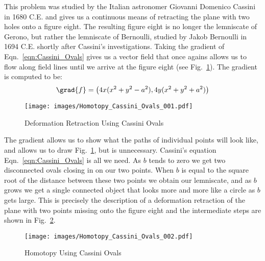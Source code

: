 \documentclass[oneside]{book}                                                  %
\begin{document}
                This problem was studied by the Italian astronomer Giovanni
                Domenico Cassini in 1680 C.E. and gives us a continuous means of
                retracting the plane with two holes onto a figure eight. The
                resulting figure eight is no longer the lemniscate of Gerono,
                but rather the lemniscate of Bernoulli, studied by Jakob
                Bernoulli in 1694 C.E. shortly after Cassini's investigations.
                Taking the gradient of Eqn.~\ref{eqn:Cassini_Ovals} gives us a
                vector field that once agains allows us to flow along field
                lines until we arrive at the figure eight
                (see Fig.~\ref{fig:Deformation_Retraction_Cassini_Ovals}). The
                gradient is computed to be:
                \begin{equation}
                    \grad{f}=\big(4x(x^{2}+y^{2}-a^{2}),4y(x^{2}+y^{2}+a^2)\big)
                \end{equation}
                \begin{figure}[H]
                    \centering
                    \captionsetup{type=figure}
                    \texttt{[image: images/Homotopy\_Cassini\_Ovals\_001.pdf]}
                    \caption{Deformation Retraction Using Cassini Ovals}
                    \label{fig:Deformation_Retraction_Cassini_Ovals}
                \end{figure}
                The gradient allows us to show what the paths of individual
                points will look like, and allows us to draw
                Fig.~\ref{fig:Deformation_Retraction_Cassini_Ovals}, but is
                unnecessary. Cassini's equation Eqn.~\ref{eqn:Cassini_Ovals} is
                all we need. As $b$ tends to zero we get two disconnected ovals
                closing in on our two points. When $b$ is equal to the square
                root of the distance between these two points we obtain our
                lemniscate, and as $b$ grows we get a single connected object
                that looks more and more like a circle as $b$ gets large. This
                is precisely the description of a deformation retraction of the
                plane with two points missing onto the figure eight and the
                intermediate steps are shown in
                Fig.~\ref{fig:Homotopy_Cassini_Ovals}.
                \begin{figure}[H]
                    \centering
                    \captionsetup{type=figure}
                    \texttt{[image: images/Homotopy\_Cassini\_Ovals\_002.pdf]}
                    \caption{Homotopy Using Cassini Ovals}
                    \label{fig:Homotopy_Cassini_Ovals}
                \end{figure}
\end{document}
